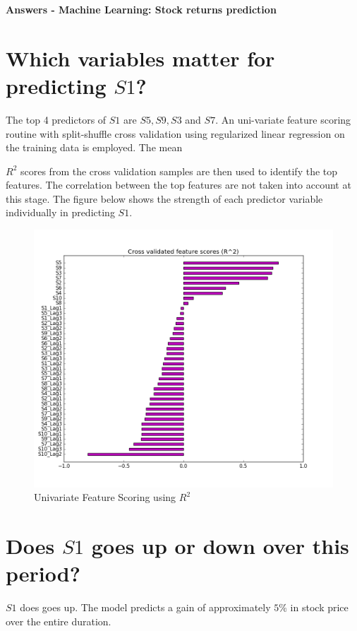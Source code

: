 \documentclass[11pt]{article}
\begin{document}
\begin{center}
{\Large \bf Answers - Machine Learning: Stock returns prediction}
\end{center}

\section{Which variables matter for predicting \(S1\)?}
The top 4 predictors of \(S1\) are {\bf \(S5, S9, S3\)} and {\bf \(S7\)}.  An uni-variate feature scoring routine with split-shuffle cross validation using regularized linear regression on the training data is employed. The mean {\(R^{2}\) scores from the cross validation samples are then used to identify the top features. The correlation between the top features are not taken into account at this stage. The figure below shows the strength of each predictor variable individually in predicting \(S1\). 
\begin{figure}[H]
\caption{Univariate Feature Scoring using \(R^{2}\)}
\includegraphics[width=1\textwidth,center]{fig1.png}
\end{figure}

\section{Does \(S1\) goes up or down over this period?}
\(S1\) does goes up. The model predicts a gain of approximately \(5\%\) in stock price over the entire duration.

}
\end{document}
